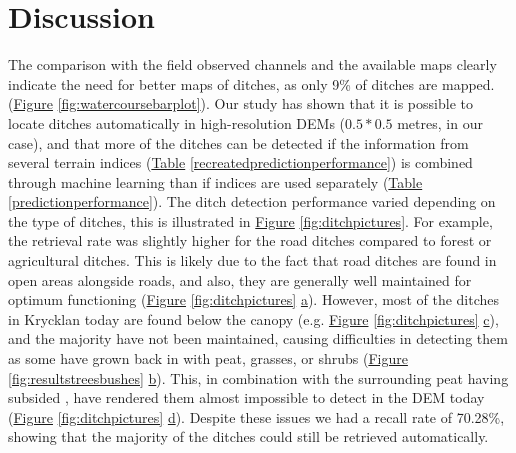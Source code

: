 \documentclass[]{interact}
\theoremstyle{plain}%
\theoremstyle{definition}
\theoremstyle{remark}
\begin{document}
\section{Discussion}

The comparison with the field observed channels and the available maps clearly indicate the need for better maps of ditches, as only 9\% of ditches are mapped.  (\hyperref[fig:watercoursebarplot]{Figure} \ref{fig:watercoursebarplot}). Our study has shown that it is possible to locate ditches automatically in high-resolution DEMs ($0.5  * 0.5 $ metres, in our case), and that more of the ditches can be detected if the information from several terrain indices (\hyperref[recreatedpredictionperformance]{Table} \ref{recreatedpredictionperformance}) is combined through machine learning than if indices are used separately (\hyperref[predictionperformance]{Table} \ref{predictionperformance}).
The ditch detection performance varied depending on the type of ditches, this is illustrated in \hyperref[fig:ditchpictures]{Figure} \ref{fig:ditchpictures}. For example, the retrieval rate was slightly higher for the road ditches compared to forest or agricultural ditches. This is likely due to the fact that  road ditches are found in open areas alongside roads, and also,   they are generally well maintained for optimum functioning (\hyperref[fig:ditchpictures]{Figure} \ref{fig:ditchpictures} \hyperref[fig:ditchpictures]{a}). However, most of the ditches in Krycklan today are found below the canopy (e.g. \hyperref[fig:ditchpictures]{Figure} \ref{fig:ditchpictures} \hyperref[fig:ditchpictures]{c}), and the majority have not been maintained, causing difficulties in detecting them as some have grown back in with peat, grasses, or shrubs (\hyperref[fig:resultstreesbushes]{Figure} \ref{fig:resultstreesbushes} \hyperref[fig:resultstreesbushes]{b}). This, in combination with the surrounding peat having subsided \citep{heikurainen}, have rendered them almost impossible to detect in the DEM today (\hyperref[fig:ditchpictures]{Figure} \ref{fig:ditchpictures} \hyperref[fig:ditchpictures]{d}). Despite these issues we had a recall rate of 70.28\%, showing that the majority of the ditches could still be retrieved automatically.
\end{document}
